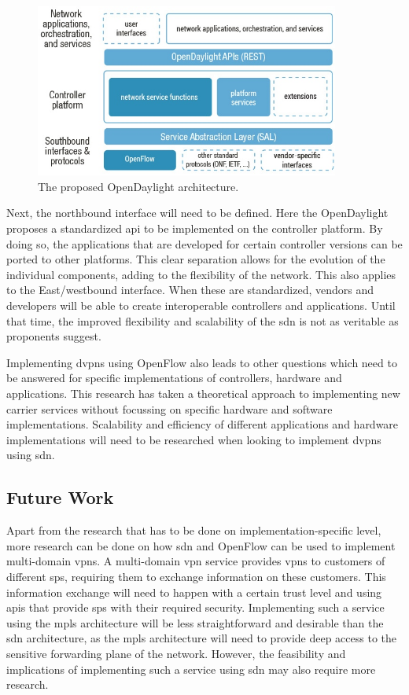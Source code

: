 \begin{figure}[!h]
	\centering
	\includegraphics[width=10cm]{./includes/opendaylight.jpg}
	\caption{The proposed OpenDaylight architecture.}
	\label{fig:opendaylight}
\end{figure}

Next, the northbound interface will need to be defined. Here the OpenDaylight proposes a standardized \ac{api} to be implemented on the controller platform. By doing so, the applications that are developed for certain controller versions can be ported to other platforms. This clear separation allows for the evolution of the individual components, adding to the flexibility of the network. This also applies to the East/westbound interface. When these are standardized, vendors and developers will be able to create interoperable controllers and applications. Until that time, the improved flexibility and scalability of the \ac{sdn} is not as veritable as proponents suggest.

Implementing \acp{dvpn} using OpenFlow also leads to other questions which need to be answered for specific implementations of controllers, hardware and applications. 
This research has taken a theoretical approach to implementing new carrier services without focussing on specific hardware and software implementations. Scalability and efficiency of different applications and hardware implementations will need to be researched when looking to implement \acp{dvpn} using \ac{sdn}. 


\subsection{Future Work} %
\label{sub:future_work}

Apart from the research that has to be done on implementation-specific level, more  research can be done on how \ac{sdn} and OpenFlow can be used to implement multi-domain \acp{vpn}. A multi-domain \ac{vpn} service provides \acp{vpn} to customers of different \acp{sp}, requiring them to exchange information on these customers. This information exchange will need to happen with a certain trust level and using \acp{api} that provide \acp{sp} with their required security. Implementing such a service using the \ac{mpls} architecture will be less straightforward and desirable than the \ac{sdn} architecture, as the \ac{mpls} architecture will need to provide deep access to the sensitive forwarding plane of the network. However, the feasibility and implications of implementing such a service using \ac{sdn} may also require more research.

